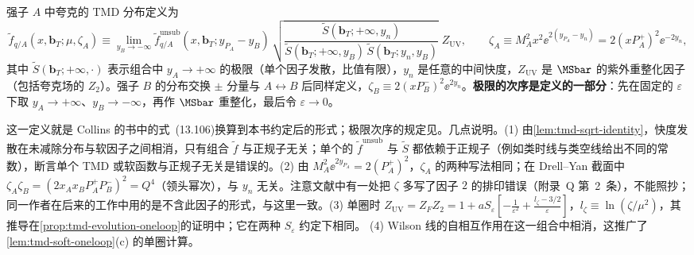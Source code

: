 \begin{definition}\label{def:tmd-collins}
强子 $A$ 中夸克的 TMD 分布定义为
\begin{equation}\label{eq:tmd-collins-def}
\tilde f_{q/A}(x,\mathbf b_T;\mu,\zeta_A)\equiv\lim_{y_B\to-\infty}\tilde f^{\mathrm{unsub}}_{q/A}(x,\mathbf b_T;y_{P_A}-y_B)\,\sqrt{\frac{\tilde S(\mathbf b_T;+\infty,y_n)}{\tilde S(\mathbf b_T;+\infty,y_B)\,\tilde S(\mathbf b_T;y_n,y_B)}}\;Z_{\mathrm{UV}},
\qquad\zeta_A\equiv M_A^2x^2\ee^{2(y_{P_A}-y_n)}=2(xP_A^+)^2\ee^{-2y_n},
\end{equation}
其中 $\tilde S(\mathbf b_T;+\infty,\cdot)$ 表示组合中 $y_A\to+\infty$ 的极限（单个因子发散，比值有限），$y_n$ 是任意的中间快度，$Z_{\mathrm{UV}}$ 是 $\MSbar$ 的紫外重整化因子（包括夸克场的 $Z_2$）。强子 $B$ 的分布交换 $\pm$ 分量与 $A\leftrightarrow B$ 后同样定义，$\zeta_B\equiv2(xP_B^-)^2\ee^{2y_n}$。\textbf{极限的次序是定义的一部分}：先在固定的 $\varepsilon$ 下取 $y_A\to+\infty$、$y_B\to-\infty$，再作 $\MSbar$ 重整化，最后令 $\varepsilon\to0$。
\end{definition}

这一定义就是 Collins 的书中的式~(13.106)\cite[式~(13.106)、(13.107)]{Collins2011}换算到本书约定后的形式；极限次序的规定见\cite[第~10.8.2~节]{Collins2011}。几点说明。(1) 由\cref{lem:tmd-sqrt-identity}，快度发散在未减除分布与软因子之间相消，只有组合 $\tilde f$ 与正规子无关；单个的 $\tilde f^{\mathrm{unsub}}$ 与 $\tilde S$ 都依赖于正规子（例如类时线与类空线给出不同的常数），断言单个 TMD 或软函数与正规子无关是错误的。(2) 由 $M_A^2\ee^{2y_{P_A}}=2(P_A^+)^2$，$\zeta_A$ 的两种写法相同；在 Drell--Yan 截面中 $\zeta_A\zeta_B=(2x_Ax_BP_A^+P_B^-)^2=Q^4$（领头幂次），与 $y_n$ 无关。注意文献中有一处把 $\zeta$ 多写了因子 $2$ 的排印错误（附录~Q 第~2~条），不能照抄；同一作者在后来的工作中用的是不含此因子的形式\cite{Aybat:2011ge}，与这里一致\cite[式~(14.33)]{Collins2011}。(3) 单圈时 $Z_{\mathrm{UV}}=Z_FZ_2=1+aS_\varepsilon[-\frac1{\varepsilon^2}+\frac{l_\zeta-3/2}{\varepsilon}]$，$l_\zeta\equiv\ln(\zeta/\mu^2)$，其推导在\cref{prop:tmd-evolution-oneloop}的证明中；它在两种 $S_\varepsilon$ 约定下相同。%
(4) Wilson 线的自相互作用在这一组合中相消\cite[第~13.7.2~节]{Collins2011}，这推广了\cref{lem:tmd-soft-oneloop}(c) 的单圈计算。


